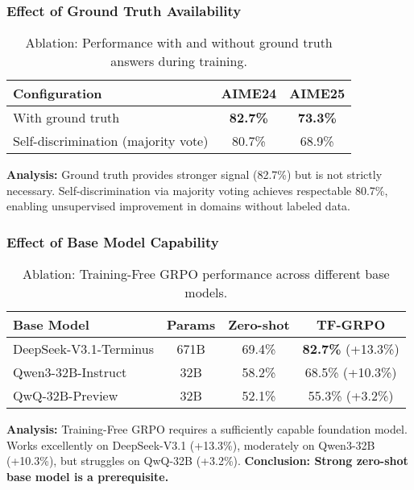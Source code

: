 \documentclass[11pt,a4paper]{article}
\begin{document}
\subsubsection{Effect of Ground Truth Availability}

\begin{table}[h]
\centering
\caption{Ablation: Performance with and without ground truth answers during training.}
\label{tab:groundtruth}
\begin{tabular}{@{}lcc@{}}
\toprule
\textbf{Configuration} & \textbf{AIME24} & \textbf{AIME25} \\
\midrule
With ground truth & \textbf{82.7\%} & \textbf{73.3\%} \\
Self-discrimination (majority vote) & 80.7\% & 68.9\% \\
\bottomrule
\end{tabular}
\end{table}

\textbf{Analysis:} Ground truth provides stronger signal (82.7\%) but is not strictly necessary. Self-discrimination via majority voting achieves respectable 80.7\%, enabling unsupervised improvement in domains without labeled data.

\subsubsection{Effect of Base Model Capability}

\begin{table}[h]
\centering
\caption{Ablation: Training-Free GRPO performance across different base models.}
\label{tab:models}
\begin{tabular}{@{}lccc@{}}
\toprule
\textbf{Base Model} & \textbf{Params} & \textbf{Zero-shot} & \textbf{TF-GRPO} \\
\midrule
DeepSeek-V3.1-Terminus & 671B & 69.4\% & \textbf{82.7\%} (+13.3\%) \\
Qwen3-32B-Instruct & 32B & 58.2\% & 68.5\% (+10.3\%) \\
QwQ-32B-Preview & 32B & 52.1\% & 55.3\% (+3.2\%) \\
\bottomrule
\end{tabular}
\end{table}

\textbf{Analysis:} Training-Free GRPO requires a sufficiently capable foundation model. Works excellently on DeepSeek-V3.1 (+13.3\%), moderately on Qwen3-32B (+10.3\%), but struggles on QwQ-32B (+3.2\%). \textbf{Conclusion: Strong zero-shot base model is a prerequisite.}
\end{document}
